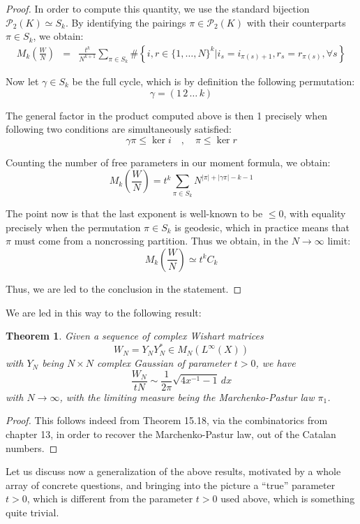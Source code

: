 \documentclass[12pt]{amsbook}
\newtheorem{theorem}{Theorem}[chapter]
\begin{document}
\begin{proof}
In order to compute this quantity, we use the standard bijection $\mathcal P_2(K)\simeq S_k$. By identifying the pairings $\pi\in\mathcal P_2(K)$ with their counterparts $\pi\in S_k$, we obtain:
\begin{eqnarray*}
M_k\left(\frac{W}{N}\right)
&=&\frac{t^k}{N^{k+1}}\sum_{\pi\in S_k}\#\left\{i,r\in\{1,\ldots,N\}^k\Big|i_s=i_{\pi(s)+1},r_s=r_{\pi(s)},\forall s\right\}
\end{eqnarray*}

Now let $\gamma\in S_k$ be the full cycle, which is by definition the following permutation:
$$\gamma=(1 \, 2 \, \ldots \, k)$$

The general factor in the product computed above is then 1 precisely when following two conditions are simultaneously satisfied:
$$\gamma\pi\leq\ker i\quad,\quad 
\pi\leq\ker r$$

Counting the number of free parameters in our moment formula, we obtain:
$$M_k\left(\frac{W}{N}\right)
=t^k\sum_{\pi\in S_k}N^{|\pi|+|\gamma\pi|-k-1}$$

The point now is that the last exponent is well-known to be $\leq 0$, with equality precisely when the permutation $\pi\in S_k$ is geodesic, which in practice means that $\pi$ must come from a noncrossing partition. Thus we obtain, in the $N\to\infty$ limit:
$$M_k\left(\frac{W}{N}\right)\simeq t^kC_k$$

Thus, we are led to the conclusion in the statement.
\end{proof}

We are led in this way to the following result:


\begin{theorem}
Given a sequence of complex Wishart matrices
$$W_N=Y_NY_N^*\in M_N(L^\infty(X))$$
with $Y_N$ being $N\times N$ complex Gaussian of parameter $t>0$, we have
$$\frac{W_N}{tN}\sim\frac{1}{2\pi}\sqrt{4x^{-1}-1}\,dx$$
with $N\to\infty$, with the limiting measure being the Marchenko-Pastur law $\pi_1$.
\end{theorem}

\begin{proof}
This follows indeed from Theorem 15.18, via the combinatorics from chapter 13, in order to recover the Marchenko-Pastur law, out of the Catalan numbers.
\end{proof}

Let us discuss now a generalization of the above results, motivated by a whole array of concrete questions, and bringing into the picture a ``true'' parameter $t>0$, which is different from the parameter $t>0$ used above, which is something quite trivial. 
\end{document}
